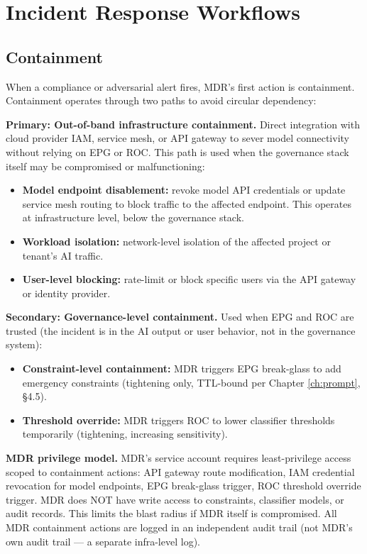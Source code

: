 \section{Incident Response Workflows}
\label{sec:monitoring-5}


\subsection{Containment}


When a compliance or adversarial alert fires, MDR's first action is containment. Containment operates through two paths to avoid circular dependency:

\textbf{Primary: Out-of-band infrastructure containment.} Direct integration with cloud provider IAM, service mesh, or API gateway to sever model connectivity without relying on EPG or ROC. This path is used when the governance stack itself may be compromised or malfunctioning:

\begin{itemize}
  \item \textbf{Model endpoint disablement:} revoke model API credentials or update service mesh routing to block traffic to the affected endpoint. This operates at infrastructure level, below the governance stack.
  \item \textbf{Workload isolation:} network-level isolation of the affected project or tenant's AI traffic.
  \item \textbf{User-level blocking:} rate-limit or block specific users via the API gateway or identity provider.
\end{itemize}


\textbf{Secondary: Governance-level containment.} Used when EPG and ROC are trusted (the incident is in the AI output or user behavior, not in the governance system):

\begin{itemize}
  \item \textbf{Constraint-level containment:} MDR triggers EPG break-glass to add emergency constraints (tightening only, TTL-bound per Chapter \ref{ch:prompt}, \S{}4.5).
  \item \textbf{Threshold override:} MDR triggers ROC to lower classifier thresholds temporarily (tightening, increasing sensitivity).
\end{itemize}


\textbf{MDR privilege model.} MDR's service account requires least-privilege access scoped to containment actions: API gateway route modification, IAM credential revocation for model endpoints, EPG break-glass trigger, ROC threshold override trigger. MDR does NOT have write access to constraints, classifier models, or audit records. This limits the blast radius if MDR itself is compromised. All MDR containment actions are logged in an independent audit trail (not MDR's own audit trail --- a separate infra-level log).

